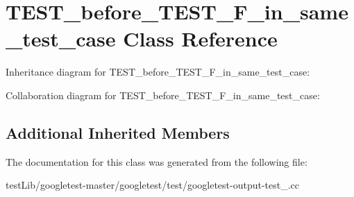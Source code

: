 \hypertarget{classTEST__before__TEST__F__in__same__test__case}{}\section{T\+E\+S\+T\+\_\+before\+\_\+\+T\+E\+S\+T\+\_\+\+F\+\_\+in\+\_\+same\+\_\+test\+\_\+case Class Reference}
\label{classTEST__before__TEST__F__in__same__test__case}


Inheritance diagram for T\+E\+S\+T\+\_\+before\+\_\+\+T\+E\+S\+T\+\_\+\+F\+\_\+in\+\_\+same\+\_\+test\+\_\+case\+:


Collaboration diagram for T\+E\+S\+T\+\_\+before\+\_\+\+T\+E\+S\+T\+\_\+\+F\+\_\+in\+\_\+same\+\_\+test\+\_\+case\+:
\subsection*{Additional Inherited Members}


The documentation for this class was generated from the following file\+:\begin{DoxyCompactItemize}
\item 
test\+Lib/googletest-\/master/googletest/test/googletest-\/output-\/test\+\_\+.\+cc\end{DoxyCompactItemize}
